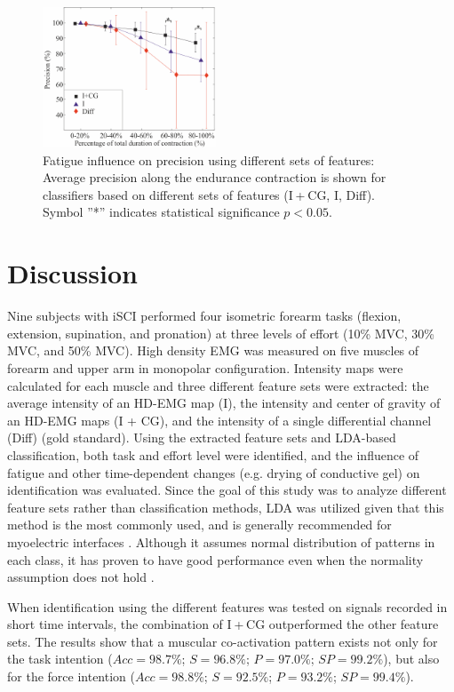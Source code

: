 \begin{figure}[ht]
\centering
\includegraphics[width=0.459\textwidth]{Images/figure1_10.png}
\caption{Fatigue influence on precision using different sets of features: Average precision along the endurance contraction is shown for classifiers based on different sets of features (I + CG, I, Diff). Symbol ”*” indicates statistical significance $p < 0.05$.}
\label{fig:1-10}
\end{figure}      



\section{Discussion}
Nine subjects with iSCI performed four isometric forearm tasks (flexion, extension, supination, and pronation) at three levels of effort (10\% MVC, 30\% MVC, and 50\% MVC). High density EMG was measured on five muscles of forearm and upper arm in monopolar configuration. Intensity maps were calculated for each muscle and three different feature sets were extracted: the average intensity of an HD-EMG map (I), the intensity and center of gravity of an HD-EMG maps (I + CG), and the intensity of a single differential channel (Diff) (gold standard). Using the extracted feature sets and LDA-based classification, both task and effort level were identified, and the influence of fatigue and other time-dependent changes (e.g. drying of conductive gel) on identification was evaluated. Since the goal of this study was to analyze different feature sets rather than classification methods, LDA was utilized given that this method is the most commonly used, and is generally recommended for myoelectric interfaces \citep{Hakonen2015}. Although it assumes normal distribution of patterns in each class, it has proven to have good performance even when the normality assumption does not hold \citep{Grouven1996}.

When identification using the different features was tested on signals recorded in short time intervals, the combination of I + CG outperformed the other feature sets. The results show that a muscular co-activation pattern exists not only for the task intention ($Acc = 98.7\%$; $S = 96.8\%$; $P = 97.0\%$; $SP = 99.2\%$), but also for the force intention ($Acc = 98.8\%$; $S = 92.5\%$; $P = 93.2\%$; $SP = 99.4\%$).

